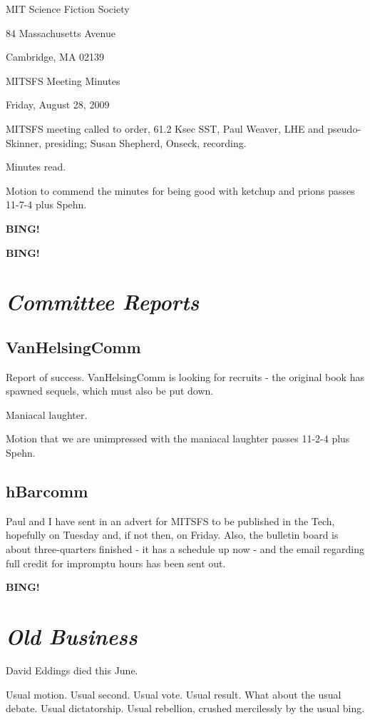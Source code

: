 \documentclass[10pt]{article}
\newcommand{\bing}{{\bf BING!} }
\newcommand{\goto}[1]{\bing \vskip 12pt \section*{{\em{#1}}}}
\newcommand{\ps}{ plus Spehn\xspace}
\begin{document}
\begin{center}

MIT Science Fiction Society

84 Massachusetts Avenue

Cambridge, MA 02139

\vspace{12pt}

MITSFS Meeting Minutes

Friday, August 28, 2009

\end{center}

\vspace{18pt}

\setlength{\parskip}{6pt}

\noindent
MITSFS meeting called to order, 61.2 Ksec SST,
Paul Weaver, LHE and pseudo-Skinner, presiding; Susan Shepherd, Onseck, recording.

Minutes read.

Motion to commend the minutes for being good with ketchup and prions passes 11-7-4\ps.

\bing

\goto{Committee Reports}

\subsection*{VanHelsingComm}
Report of success. VanHelsingComm is looking for recruits - the original book has spawned sequels, which must also be put down.

Maniacal laughter.

Motion that we are unimpressed with the maniacal laughter passes 11-2-4\ps.

\subsection*{hBarcomm}
Paul and I have sent in an advert for MITSFS to be published in the Tech, hopefully on Tuesday and, if not then, on Friday. Also, the bulletin board is about three-quarters finished - it has a schedule up now - and the email regarding full credit for impromptu hours has been sent out.

\goto{Old Business}

David Eddings died this June.

Usual motion. Usual second. Usual vote. Usual result. What about the usual debate. Usual dictatorship. Usual rebellion, crushed mercilessly by the usual bing.
\end{document}

